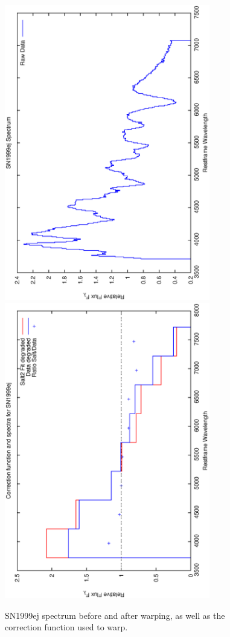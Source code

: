 \clearpage

\begin{figure}[p]
\centering
\includegraphics[angle=-90,width=0.8\textwidth]{./figures/spectrabeforeafter/SN1999ej_handpicked_v001_v027_before_after_spectra.ps}
\hfill
\includegraphics[angle=-90,width=0.8\textwidth]{./figures/corrections/SN1999ej_v001_correction.ps}
\hfill
\caption{SN1999ej spectrum before and after warping, as well as the correction function used to warp.}
\label{fig:SN1999ejfour1}
\end{figure}

